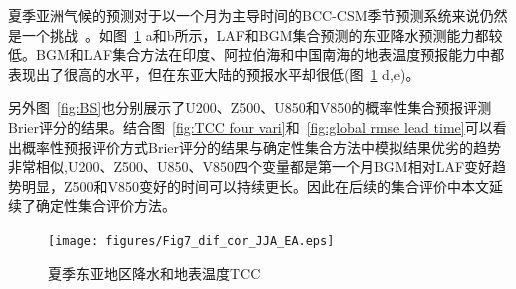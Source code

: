 夏季亚洲气候的预测对于以一个月为主导时间的BCC-CSM季节预测系统来说仍然是一个挑战~\cite{liu2015performance}。如图~\ref{fig:summer pre and sat} a和b所示，LAF和BGM集合预测的东亚降水预测能力都较低。BGM和LAF集合方法在印度、阿拉伯海和中国南海的地表温度预报能力中都表现出了很高的水平，但在东亚大陆的预报水平却很低(图~\ref{fig:summer pre and sat} d,e)。

另外图~\ref{fig:BS}也分别展示了U200、Z500、U850和V850的概率性集合预报评测Brier评分的结果。结合图~\ref{fig:TCC four vari}和~\ref{fig:global rmse lead time}可以看出概率性预报评价方式Brier评分的结果与确定性集合方法中模拟结果优劣的趋势非常相似,U200、Z500、U850、V850四个变量都是第一个月BGM相对LAF变好趋势明显，Z500和V850变好的时间可以持续更长。因此在后续的集合评价中本文延续了确定性集合评价方法。

\begin{figure}[H] %
  \centering
  \texttt{[image: figures/Fig7\_dif\_cor\_JJA\_EA.eps]}
  \caption{夏季东亚地区降水和地表温度TCC}
  \label{fig:summer pre and sat}
\end{figure}
